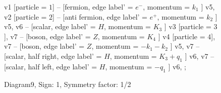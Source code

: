 \documentclass{revtex4}
\begin{document}
\begin{figure}[!htb]
\begin{center}
{    %
v1 [particle = \(1\)] -- [fermion, edge label' = \(e^{-}\), momentum = \(k_{1}\) ] v5, 
v2 [particle = \(2\)] -- [anti fermion, edge label' = \(e^{+}\), momentum = \(k_{2}\) ] v5, 
v6 -- [scalar, edge label' = \(H\), momentum = \(K_{3}\) ] v3 [particle = \(3\)], 
v7 -- [boson, edge label' = \(Z\), momentum = \(K_{4}\) ] v4 [particle = \(4\)], 
v7 -- [boson, edge label' = \(Z\), momentum = \(-k_{1} - k_{2}\) ] v5, 
v7 -- [scalar, half right, edge label' = \(H\), momentum = \(K_{3} + q_{1}\) ] v6, 
v7 -- [scalar, half left, edge label' = \(H\), momentum = \(-q_{1}\) ] v6, 
};
\end{center}
\caption{Diagram9, Sign: 1, Symmetry factor: 1/2}
\end{figure}
\newpage
\end{document}
